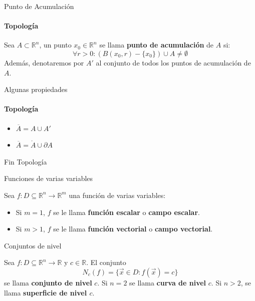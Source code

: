 \documentclass{plantillaPPT}
\begin{document}
\begin{frame}{Punto de Acumulación}
\framesubtitle{Topología}

\begin{definicion}
    Sea \(A\subset\mathbb{R}^n\), un punto \(x_0\in \mathbb{R}^n\) se llama \textbf{punto de acumulación} de \(A\) si:
    \[\forall r>0: (B(x_0,r)-\{x_0\})\cup A \neq \emptyset\]
    Además, denotaremos por \(A'\) al conjunto de todos los puntos de acumulación de \(A\).
\end{definicion}
    
\end{frame}

\begin{frame}{Algunas propiedades}
\framesubtitle{Topología}
\centering
\begin{itemize}
    \item \(\overline{A}=A\cup A'\)
    \item \(\overline{A}=\mathring{A}\cup \partial A\)
\end{itemize}

\end{frame}

\begin{frame}[plain]
    \centering
    {\Huge {} Fin Topología} \\
\end{frame}

\begin{frame}{Funciones de varias variables}
\begin{definicion}
    Sea \(f: D\subseteq\mathbb{R}^n\to\mathbb{R}^m\) una función de varias variables:
    \begin{itemize}
        \item Si \(m = 1\), \(f\) se le llama \textbf{función escalar} o \textbf{campo escalar}.
        \item Si \(m > 1\), \(f\) se le llama \textbf{función vectorial} o \textbf{campo vectorial}.
    \end{itemize}
\end{definicion}
\end{frame}

\begin{frame}{Conjuntos de nivel}
\begin{definicion}
    Sea \(f: D\subseteq\mathbb{R}^n\to\mathbb{R}\) y \(c\in\mathbb{R}\). El conjunto
    \[N_c(f) = \{\Vec{x}\in D: f(\vec{x}) = c\}\]
    se llama \textbf{conjunto de nivel} \(c\). Si \(n=2\) se llama \textbf{curva de nivel} \(c\). Si \(n>2\), se llama \textbf{superficie de nivel \(c\)}.
\end{definicion}
    
\end{frame}
\end{document}
